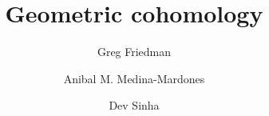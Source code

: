 \documentclass{amsart}
\title{Geometric cohomology}
\author[G. Friedman]{Greg Friedman}
\author[A. Medina-Mardones]{Anibal M. Medina-Mardones}
\author[D. Sinha]{Dev Sinha}
\begin{document}
	
	\maketitle

	\tableofcontents

	
	

	\pagebreak
	
	
	
\end{document}
